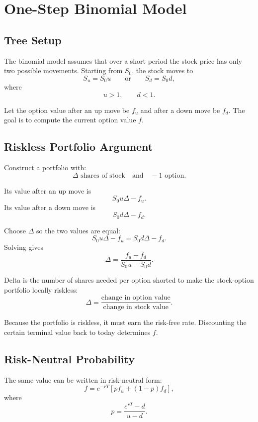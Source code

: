 \section{One-Step Binomial Model}

\subsection{Tree Setup}

The binomial model assumes that over a short period the stock price has only two
possible movements. Starting from $S_0$, the stock moves to
\[
    S_u=S_0u
    \qquad \text{or} \qquad
    S_d=S_0d,
\]
where
\[
    u>1,
    \qquad
    d<1.
\]

Let the option value after an up move be $f_u$ and after a down move be $f_d$.
The goal is to compute the current option value $f$.

\subsection{Riskless Portfolio Argument}

Construct a portfolio with:
\[
    \Delta \text{ shares of stock}
    \quad \text{and} \quad
    -1 \text{ option}.
\]

Its value after an up move is
\[
    S_0u\Delta - f_u.
\]
Its value after a down move is
\[
    S_0d\Delta - f_d.
\]

Choose $\Delta$ so the two values are equal:
\[
    S_0u\Delta - f_u
    =
    S_0d\Delta - f_d.
\]
Solving gives
\[
    \Delta
    =
    \frac{f_u-f_d}{S_0u-S_0d}.
\]

\begin{defN}
Delta is the number of shares needed per option shorted to make the
stock-option portfolio locally riskless:
\[
    \Delta
    =
    \frac{\text{change in option value}}{\text{change in stock value}}.
\]
\end{defN}

Because the portfolio is riskless, it must earn the risk-free rate. Discounting
the certain terminal value back to today determines $f$.

\subsection{Risk-Neutral Probability}

The same value can be written in risk-neutral form:
\[
    f = e^{-rT}\left[p f_u+(1-p)f_d\right],
\]
where
\[
    p=\frac{e^{rT}-d}{u-d}.
\]

